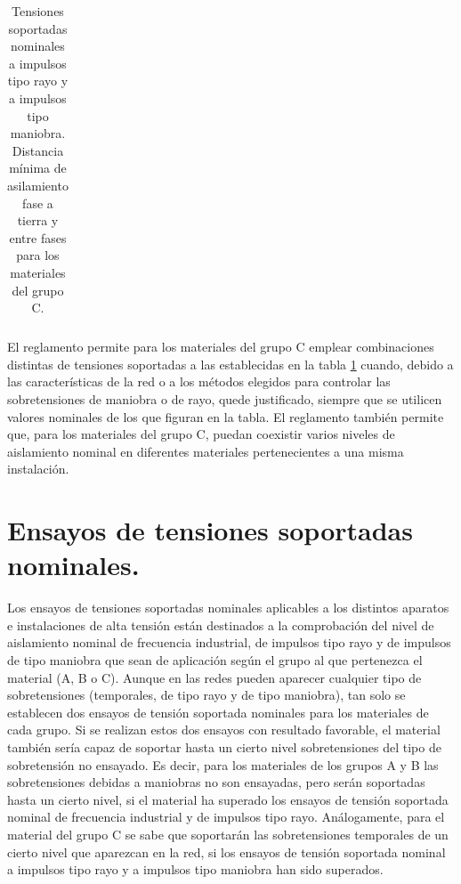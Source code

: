 \begin{table}[H]
{\begin{tabular}{|c|c|c|c|c|c|c|c|}
                \end{tabular}
                }
                \caption{Tensiones soportadas nominales a impulsos tipo rayo y a impulsos tipo maniobra. Distancia mínima de asilamiento fase a tierra y entre fases para los materiales del grupo C.}
                \label{tab:tensionesSoportadasC}
            \end{table}

            El reglamento permite para los materiales del grupo C emplear combinaciones distintas de tensiones soportadas a las establecidas en la tabla \ref{tab:tensionesSoportadasC} cuando, debido a las características de la red o a los métodos elegidos para controlar las sobretensiones de maniobra o de rayo, quede justificado, siempre que se utilicen valores nominales de los que figuran en la tabla. El reglamento también permite que, para los materiales del grupo C, puedan coexistir varios niveles de aislamiento nominal en diferentes materiales pertenecientes a una misma instalación.

    \section{Ensayos de tensiones soportadas nominales.}
        Los ensayos de tensiones soportadas nominales aplicables a los distintos aparatos e instalaciones de alta tensión están destinados a la comprobación del nivel de aislamiento nominal de frecuencia industrial, de impulsos tipo rayo y de impulsos de tipo maniobra que sean de aplicación según el grupo al que pertenezca el material (A, B o C). Aunque en las redes pueden aparecer cualquier tipo de sobretensiones (temporales, de tipo rayo y de tipo maniobra), tan solo se establecen dos ensayos de tensión soportada nominales para los materiales de cada grupo. Si se realizan estos dos ensayos con resultado favorable, el material también sería capaz de soportar hasta un cierto nivel sobretensiones del tipo de sobretensión no ensayado. Es decir, para los materiales de los grupos A y B las sobretensiones debidas a maniobras no son ensayadas, pero serán soportadas hasta un cierto nivel, si el material ha superado los ensayos de tensión soportada nominal de frecuencia industrial y de impulsos tipo rayo. Análogamente, para el material del grupo C se sabe que soportarán las sobretensiones temporales de un cierto nivel que aparezcan en la red, si los ensayos de tensión soportada nominal a impulsos tipo rayo y a impulsos tipo maniobra han sido superados.\newline
        
